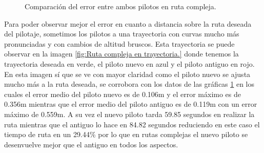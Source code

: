 \begin{figure}[H]
 \centering
 \caption{Comparación del error entre ambos pilotos en ruta compleja.}
 \label{f:Comparativa del error compleja.}
\end{figure} 

\hspace{1cm} Para poder observar mejor el error en cuanto a distancia sobre la ruta deseada del pilotaje, sometimos los pilotos a una trayectoria con curvas mucho más pronunciadas y con cambios de altitud bruscos. Esta trayectoria se puede observar en la imagen \ref{fig:Ruta compleja en trayectoria.} donde tenemos la trayectoria deseada en verde, el piloto nuevo en azul y el piloto antiguo en rojo. En esta imagen sí que se ve con mayor claridad como el piloto nuevo se ajusta mucho más a la ruta deseada, se corrobora con los datos de las gráficas \ref{f:Comparativa del error compleja.} en los cuales el error medio del piloto nuevo es de 0.106m y el error máximo es de 0.356m mientras que el error medio del piloto antiguo es de 0.119m con un error máximo de 0.559m. A su vez el nuevo piloto tarda 59.85 segundos en realizar la ruta mientras que el antiguo lo hace en 84.82 segundos reduciendo en este caso el tiempo de ruta en un 29.44\% por lo que en rutas complejas el nuevo piloto se desenvuelve mejor que el antiguo en todos los aspectos.


